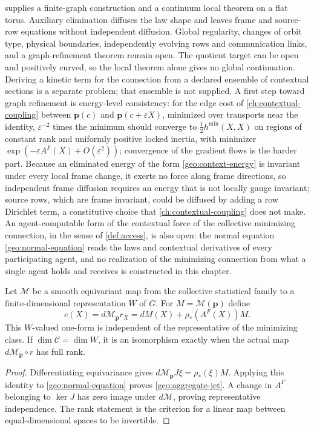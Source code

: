  supplies a finite-graph construction and a continuum local theorem on a flat torus. Auxiliary elimination diffuses the law shape and leaves frame and source-row equations without independent diffusion. Global regularity, changes of orbit type, physical boundaries, independently evolving rows and communication links, and a graph-refinement theorem remain open. The quotient target can be open and positively curved, so the local theorem alone gives no global continuation. Deriving a kinetic term for the connection from a declared ensemble of contextual sections is a separate problem; that ensemble is not supplied. A first step toward graph refinement is energy-level consistency: for the edge cost of \cref{ch:contextual-coupling} between $\boldsymbol p(c)$ and $\boldsymbol p(c+\varepsilon X)$, minimized over transports near the identity, $\varepsilon^{-2}$ times the minimum should converge to $\tfrac12h^{\min}(X,X)$ on regions of constant rank and uniformly positive locked inertia, with minimizer $\exp(-\varepsilon A^F(X)+O(\varepsilon^2))$; convergence of the gradient flows is the harder part. Because an eliminated energy of the form \cref{geo:context-energy} is invariant under every local frame change, it exerts no force along frame directions, so independent frame diffusion requires an energy that is not locally gauge invariant; source rows, which are frame invariant, could be diffused by adding a row Dirichlet term, a constitutive choice that \cref{ch:contextual-coupling} does not make. An agent-computable form of the contextual force of the collective minimizing connection, in the sense of \cref{def:access}, is also open: the normal equation \cref{geo:normal-equation} reads the laws and contextual derivatives of every participating agent, and no realization of the minimizing connection from what a single agent holds and receives is constructed in this chapter.

Let $\mathcal M$ be a smooth equivariant map from the collective statistical family to a finite-dimensional representation $W$ of $G$. For $M=\mathcal M(\boldsymbol p)$ define
\begin{equation}
e(X)=d\mathcal M_{\boldsymbol p}r_X
=dM(X)+\rho_*(A^F(X))M.
\label{geo:aggregate-jet}
\end{equation}
This $W$-valued one-form is independent of the representative of the minimizing class. If $\dim\mathcal C=\dim W$, it is an isomorphism exactly when the actual map $d\mathcal M_{\boldsymbol p}\circ r$ has full rank.
\begin{proof}
Differentiating equivariance gives $d\mathcal M_{\boldsymbol p}J\xi=\rho_*(\xi)M$. Applying this identity to \cref{geo:normal-equation} proves \cref{geo:aggregate-jet}. A change in $A^F$ belonging to $\ker J$ has zero image under $d\mathcal M$, proving representative independence. The rank statement is the criterion for a linear map between equal-dimensional spaces to be invertible.
\end{proof}

